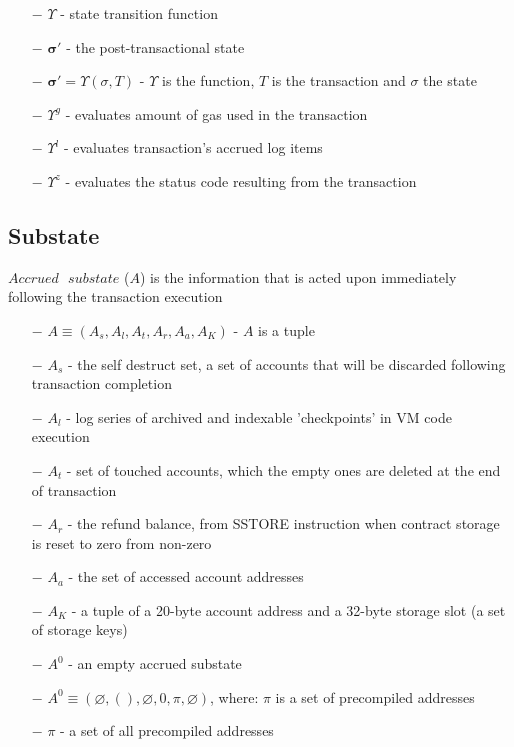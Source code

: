 \documentclass{article}
\begin{document}
\begin{itemize}
    \item[$-$] $\Upsilon$ - state transition function
    \item[$-$] $\bm{\sigma}'$ - the post-transactional state 
    \item[$-$] $\bm{\sigma}' = \Upsilon(\sigma, T)$ - $\Upsilon$ is the function, $T$ is the transaction and $\sigma$ the state
    \item[$-$] $\Upsilon^g$ - evaluates amount of gas used in the transaction
    \item[$-$] $\Upsilon^l$ - evaluates transaction's accrued log items
    \item[$-$] $\Upsilon^z$ - evaluates the status code resulting from the transaction
\end{itemize}

\subsection{Substate}

$Accrued \text{ } substate$ ($A$) is the information that is acted upon immediately following the transaction execution

\begin{itemize}
    \item[$-$] $A \equiv (A_s, A_l, A_t, A_r, A_a, A_K)$ - $A$ is a tuple
    \item[$-$] $A_s$ - the self destruct set, a set of accounts that will be discarded following transaction completion
    \item[$-$] $A_l$ - log series of archived and indexable 'checkpoints' in VM code execution
    \item[$-$] $A_t$ - set of touched accounts, which the empty ones are deleted at the end of transaction
    \item[$-$] $A_r$ - the refund balance, from SSTORE instruction when contract storage is reset to zero from non-zero
    \item[$-$] $A_a$ - the set of accessed account addresses
    \item[$-$] $A_K$ - a tuple of a 20-byte account address and a 32-byte storage slot (a set of storage keys) 
    \item[$-$] $A^0$ - an empty accrued substate
    \item[$-$] $A^0 \equiv (\varnothing, (), \varnothing, 0, \pi, \varnothing)$, where: $\pi$ is a set of precompiled addresses
    \item[$-$] $\pi$ - a set of all precompiled addresses 
\end{itemize}
\end{document}
